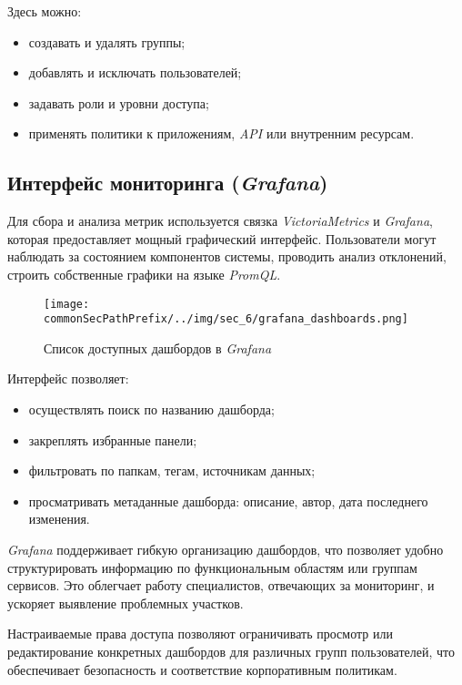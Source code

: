 Здесь можно:
\begin{itemize}
    \item создавать и удалять группы;
    \item добавлять и исключать пользователей;
    \item задавать роли и уровни доступа;
    \item применять политики к приложениям, \textit{API} или внутренним ресурсам.
\end{itemize}

\subsection{Интерфейс мониторинга (\textit{Grafana})}

Для сбора и анализа метрик используется связка \textit{VictoriaMetrics} и \textit{Grafana}, которая предоставляет мощный графический интерфейс. Пользователи могут наблюдать за состоянием компонентов системы, проводить анализ отклонений, строить собственные графики на языке \textit{PromQL}.

\begin{figure}[ht]
    \centering
    \texttt{[image: \\commonSecPathPrefix/../img/sec\_6/grafana\_dashboards.png]}
    \caption{Список доступных дашбордов в \textit{Grafana}}
    \label{fig:user_guide:grafana_dashboards}
\end{figure}

Интерфейс позволяет:
\begin{itemize}
    \item осуществлять поиск по названию дашборда;
    \item закреплять избранные панели;
    \item фильтровать по папкам, тегам, источникам данных;
    \item просматривать метаданные дашборда: описание, автор, дата последнего изменения.
\end{itemize}

\textit{Grafana} поддерживает гибкую организацию дашбордов, что позволяет удобно структурировать информацию по функциональным областям или группам сервисов. Это облегчает работу специалистов, отвечающих за мониторинг, и ускоряет выявление проблемных участков.

Настраиваемые права доступа позволяют ограничивать просмотр или редактирование конкретных дашбордов для различных групп пользователей, что обеспечивает безопасность и соответствие корпоративным политикам.

